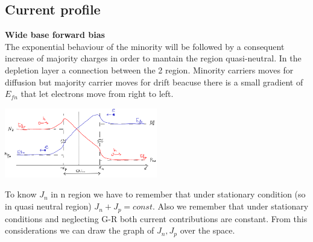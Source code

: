 \raggedright
{}
\raggedright

\raggedleft
{}
\raggedright


\subsection{Current profile}
{\bf Wide base forward bias}\\
The exponential behaviour of the minority will be followed by a consequent increase of majority charges in order to mantain the region quasi-neutral. In the depletion layer a connection between the 2 region. Minority carriers moves for diffusion but majority carrier moves for drift beacuse there is a small gradient of $E_{fn}$ that let electrons move from right to left.

\centering
\includegraphics[width=0.5\textwidth]{nxfvb.png}\\
\raggedright

To know $J_n$ in n region we have to remember that under stationary condition (so in quasi neutral region) $J_n+J_p=const$. Also we remember that under stationary conditions and neglecting G-R both current contributions are constant. From this considerations we can draw the graph of $J_n,J_p$ over the space.\\

